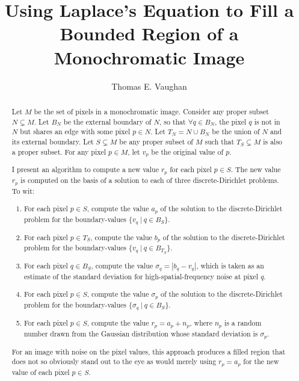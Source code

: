 \documentclass{article}
\title{%
Using Laplace's Equation to Fill a Bounded Region of a Monochromatic Image%
}
\author{Thomas E. Vaughan}
\newcommand{\foreach}{\forall}
\begin{document}
\maketitle

\begin{abstract}

   Let $M$ be the set of pixels in a monochromatic image.  Consider any proper
   subset $N \subsetneq M$.  Let $B_N$ be the external boundary of $N$, so that
   $\foreach q \in B_N$, the pixel $q$ is not in $N$ but shares an edge with
   some pixel $p \in N$.  Let $T_N = N \cup B_N$ be the union of $N$ and its
   external boundary.  Let $S \subsetneq M$ be any proper subset of $M$ such
   that $T_S \subsetneq M$ is also a proper subset.  For any pixel $p \in M$,
   let $v_p$ be the original value of $p$.

   I present an algorithm to compute a new value $r_p$ for each pixel $p \in
   S$.  The new value $r_p$ is computed on the basis of a solution to each of
   three discrete-Dirichlet problems.  To wit:
   \begin{enumerate}
      \item For each pixel $p \in S$, compute the value $a_p$ of the solution
         to the discrete-Dirichlet problem for the boundary-values $\{v_q \: |
         \: q \in B_S\}$.
      \item For each pixel $p \in T_S$, compute the value $b_p$ of the solution
         to the discrete-Dirichlet problem for the boundary-values $\{v_q \: |
         \: q \in B_{T_S}\}$.
      \item For each pixel $q \in B_S$, compute the value $\sigma_q = |b_q -
         v_q|$, which is taken as an estimate of the standard deviation for
         high-spatial-frequency noise at pixel $q$.
      \item For each pixel $p \in S$, compute the value $\sigma_p$ of the
         solution to the discrete-Dirichlet problem for the boundary-values
         $\{\sigma_q \: | \: q \in B_S\}$.
      \item For each pixel $p \in S$, compute the value $r_p = a_p + n_p$,
         where $n_p$ is a random number drawn from the Gaussian distribution
         whose standard deviation is $\sigma_p$.
   \end{enumerate}
   For an image with noise on the pixel values, this approach produces a filled
   region that does not so obviously stand out to the eye as would merely using
   $r_p = a_p$ for the new value of each pixel $p \in S$.

\end{abstract}
\end{document}
